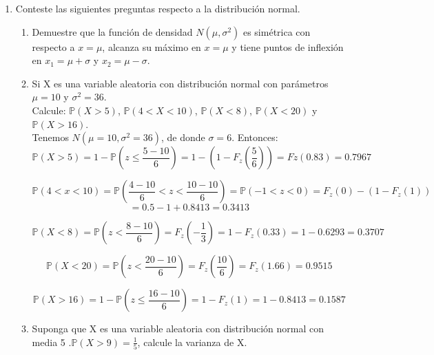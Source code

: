 \documentclass[11pt,a4paper]{report}
\begin{document}
\begin{enumerate}
{		}

		\item{
			Conteste las siguientes preguntas respecto a la distribución normal.
			\begin{enumerate}
				\item {
					Demuestre que la función de densidad $N(\mu, \sigma^2)$ es
                    simétrica con respecto a $x = \mu$, alcanza su máximo en
                    $x = \mu$ y tiene puntos de inflexión en $x_1= \mu + \sigma$
                    y $x_2 = \mu - \sigma$.\\
				}

				\item {
					Si X es una variable aleatoria con distribución normal con
                    parámetros $\mu = 10$ y $\sigma^2 = 36$.\\
                    Calcule: $\mathbb{P}(X > 5)$, $\mathbb{P}(4 < X < 10)$,
                    $\mathbb{P}(X < 8)$, $\mathbb{P}(X < 20)$ y
                    $\mathbb{P}(X > 16)$.\\

                    Tenemos  $N(\mu = 10, \sigma^2 = 36)$, de donde $\sigma = 6$.
                    Entonces:
                    \[ \mathbb{P}(X > 5) = 1 - \mathbb{P}(z \leq \frac{5-10}{6}) =1 - (1 -  F_z(\frac{5}{6})) =  Fz(0.83) = 0.7967 \]

                    \[ \mathbb{P}(4 < x < 10) = \mathbb{P}(\frac{4-10}{6} < z < \frac{10-10}{6}) =\mathbb{P}(-1 < z < 0) =  F_z(0) - (1 - F_z(1))\]
                    \[= 0.5 - 1 + 0.8413 = 0.3413 \]

                    \[ \mathbb{P}(X < 8) = \mathbb{P}(z < \frac{8-10}{6}) = F_z(-\frac{1}{3}) = 1 - F_z(0.33) = 1 - 0.6293 = 0.3707 \]

                     \[ \mathbb{P}(X < 20) = \mathbb{P}(z < \frac{20-10}{6}) = F_z(\frac{10}{6}) = F_z(1.66) = 0.9515 \]

                     \[ \mathbb{P}(X > 16) = 1 - \mathbb{P}(z \leq \frac{16-10}{6}) = 1 -  F_z(1) =  1 - 0.8413 = 0.1587 \]
				}

				\item {
				Suponga que X es una variable aleatoria con distribución normal con media 5 .$\mathbb{P} (X > 9) = \frac{1}{5}$, calcule la varianza de X.\\

}
\end{enumerate}}
\end{enumerate}
\end{document}
